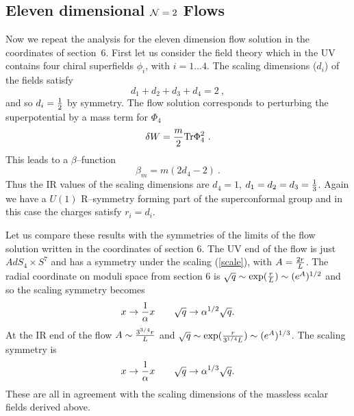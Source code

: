 \documentclass[a4paper,12pt]{article}
\newcommand{\reef}[1]{(\ref{#1})}
\begin{document}
\subsection{Eleven dimensional ${\cal N} = 2$ Flows}
\label{scaling-11d}

Now we repeat the analysis for the eleven dimension flow solution in
the coordinates of section~6. First let us consider the field theory
which in the UV contains four chiral superfields $\phi_i$, with $ i =
1\ldots4$. The scaling dimensions ($d_i$) of the fields satisfy
\begin{equation}
  d_1 + d_2 + d_3 + d_4 = 2\ ,
\end{equation}
and so $d_i = {1 \over 2}$ by symmetry.  The flow solution corresponds
to perturbing the superpotential by a mass term for $\Phi_4$
\begin{equation}
 \delta W = {m \over 2} \mbox{Tr} \Phi_4 ^2\ .
\end{equation}
This leads to a $\beta$--function 
\begin{equation}
 \beta_{m} = m (2 d_4 - 2)\ . 
\end{equation}
Thus the IR values of the scaling dimensions are $d_4 = 1$,
$d_1=d_2=d_3={1 \over 3}$. Again we have a $U(1)$ R--symmetry forming
part of the superconformal group and in this case the charges satisfy
$r_i = d_i$.

Let us compare these results with the symmetries of the limits of the
flow solution written in the coordinates of section 6. The UV end of
the flow is just $AdS_4 \times S^7$ and has a symmetry under the
scaling \reef{scale}, with $A = {2r \over L}$. The radial coordinate
on moduli space from section 6 is $\sqrt{q} \sim \exp({r \over L})
\sim (e^A)^{1/2}$ and so the scaling symmetry becomes
\begin{equation}
 x \rightarrow {1 \over \alpha} x \qquad \sqrt{q} \rightarrow \alpha^{{1/2}} \sqrt{q} .
\end{equation}
At the IR end of the flow $A \sim {3^{{3/4}} r \over L}$ and $\sqrt{q}
\sim \exp({r \over 3^{{1/4}} L}) \sim (e^A)^{1/3}$. The scaling
symmetry is
\begin{equation}
 x \rightarrow {1 \over \alpha} x \qquad \sqrt{q} \rightarrow \alpha^{{1/3}} \sqrt{q} .
\end{equation}
These are all in agreement with the scaling dimensions of the massless
scalar fields derived above.
\end{document}
